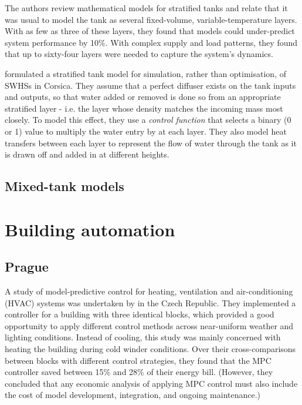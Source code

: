 The authors review mathematical models for stratified tanks and relate that it was usual to model the tank as several fixed-volume, variable-temperature layers.
With as few as three of these layers, they found that models could under-predict system performance by 10\%.
With complex supply and load patterns, they found that up to sixty-four layers were needed to capture the system's dynamics.

\textcite{Cristofari02} formulated a stratified tank model for simulation, rather than optimisation, of SWHSs in Corsica.
They assume that a perfect diffuser exists on the tank inputs and outputs, so that water added or removed is done so from an appropriate stratified layer - i.e. the layer whose density matches the incoming mass most closely.
To model this effect, they use a {\it control function} that selects a binary (0 or 1) value to multiply the water entry by at each layer.
They also model heat transfers between each layer to represent the flow of water through the tank as it is drawn off and added in at different heights.

\subsection{Mixed-tank models}
\label{sec:review:mixed-tank}


\section{Building automation}

\subsection{Prague}

A study of model-predictive control for heating, ventilation and
air-conditioning (HVAC) systems was undertaken by \textcite{Siroky11} in the Czech Republic.
They implemented a controller for a building with three identical blocks, which provided a good opportunity to apply different control methods across near-uniform weather and lighting conditions.
Instead of cooling, this study was mainly concerned with heating the building during cold winder conditions.
Over their cross-comparisons between blocks with different control strategies, they found that the MPC controller saved between 15\% and 28\% of their energy bill.
(However, they concluded that any economic analysis of applying MPC control must also include the cost of model development, integration, and ongoing maintenance.)

